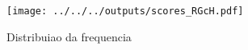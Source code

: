 \begin{frame}
  \frametitle{}
    
\end{frame}

\begin{frame}
  \frametitle{}
  \begin{figure}[H]
    \begin{center}
      \texttt{[image: ../../../outputs/scores\_RGcH.pdf]}
    \end{center}
  \caption{Distribuiao da frequencia}
\end{figure}
\end{frame}


